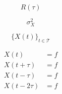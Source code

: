 \documentclass[10pt,a4paper]{article}
\begin{document}
\begin{equation}
R(\tau)
\end{equation}

\begin{equation}
\sigma_X^2
\end{equation}

\begin{equation}
\{X(t)\}_{t\in \mathcal{T}}
\end{equation}

\begin{align}
X(t) &= f \\
X(t+\tau) &= f \\
X(t-\tau) &= f \\
X(t-2\tau) &= f \\
\end{align}
\end{document}
